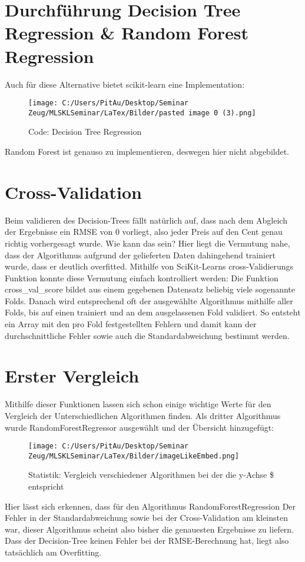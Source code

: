 \section{Durchführung Decision Tree Regression \& Random Forest Regression}
\label{durchführungDecisionTreeRegressionRandomForestRegression}
Auch für diese Alternative bietet scikit-learn eine Implementation:
\newline
\begin{figure}
	\texttt{[image: C:/Users/PitAu/Desktop/Seminar Zeug/MLSKLSeminar/LaTex/Bilder/pasted image 0 (3).png]}
	\caption{Code: Decision Tree Regression}
\end{figure}
Random Forest ist genauso zu implementieren, deswegen hier nicht abgebildet.

\section{Cross-Validation}
\label{crossValidation}
Beim validieren des Decision-Trees fällt natürlich auf, dass nach dem Abgleich der Ergebnisse ein RMSE von 0 vorliegt, also jeder Preis auf den Cent genau richtig vorhergesagt wurde. Wie kann das sein? 
Hier liegt die Vermutung nahe, dass der Algorithmus aufgrund der gelieferten Daten dahingehend trainiert wurde, dass er deutlich overfitted.
Mithilfe von SciKit-Learns cross-Validierungs Funktion konnte diese Vermutung einfach kontrolliert werden: Die Funktion cross\_val\_score bildet aus einem gegebenen Datensatz beliebig viele sogenannte Folds. Danach wird entsprechend oft der ausgewählte Algorithmus mithilfe aller Folds, bis auf einen trainiert und an dem ausgelassenen Fold validiert. So entsteht ein Array mit den pro Fold festgestellten Fehlern und damit kann der durchschnittliche Fehler sowie auch die Standardabweichung bestimmt werden.


\section{Erster Vergleich}
\label{ErsterVergleich}
Mithilfe dieser Funktionen lassen sich schon einige wichtige Werte für den Vergleich der Unterschiedlichen Algorithmen finden.
Als dritter Algorithmus wurde RandomForestRegressor ausgewählt und der Übersicht hinzugefügt:
\newline
\begin{figure}
	\texttt{[image: C:/Users/PitAu/Desktop/Seminar Zeug/MLSKLSeminar/LaTex/Bilder/imageLikeEmbed.png]}
	\caption{Statistik: Vergleich verschiedener Algorithmen bei der die y-Achse \$ entspricht}
\end{figure}
Hier lässt sich erkennen, dass für den Algorithmus RandomForestRegression Der Fehler in der Standardabweichung sowie bei der Cross-Validation am kleinsten war, dieser Algorithmus scheint also bisher die genauesten Ergebnisse zu liefern. Dass der Decision-Tree keinen Fehler bei der RMSE-Berechnung hat, liegt also tatsächlich am Overfitting.


